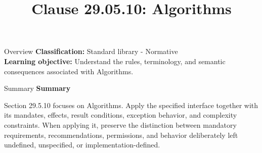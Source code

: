 \documentclass[10pt,letterpaper]{article}
\title{Clause 29.05.10: Algorithms}
\author{}
\date{}
\begin{document}
\maketitle
\begin{CornellOverviewBox}{Overview}
\textbf{Classification:} Standard library - Normative\\[2pt]
\textbf{Learning objective:} Understand the rules, terminology, and semantic consequences associated with Algorithms.
\end{CornellOverviewBox}\begin{CornellSummaryBox}{Summary}
{\sffamily\bfseries\color{Accent} Summary}\par\vspace{3pt}Section 29.5.10 focuses on Algorithms. Apply the specified interface together with its mandates, effects, result conditions, exception behavior, and complexity constraints. When applying it, preserve the distinction between mandatory requirements, recommendations, permissions, and behavior deliberately left undefined, unspecified, or implementation-defined.
\end{CornellSummaryBox}
\end{document}

